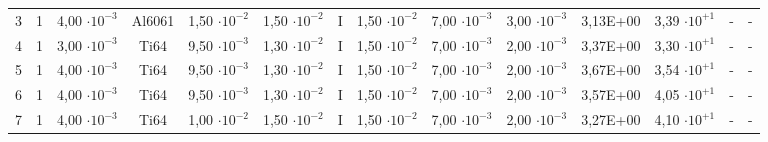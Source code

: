 \begin{table}[H]
{\begin{tabular}{lccccccccccccc}
 3                     & 1                     & 4,00 $\cdot 10^{-3}$              & Al6061                & 1,50 $\cdot 10^{-2}$              & 1,50 $\cdot 10^{-2}$              & I                      & 1,50 $\cdot 10^{-2}$              & 7,00 $\cdot 10^{-3}$              & 3,00 $\cdot 10^{-3}$              & 3,13E+00              & {\cellcolor{red}}3,39 $\cdot 10^{+1}$                    & -                                            & -                                             \\ 
  
 4                     & 1                     & 3,00 $\cdot 10^{-3}$              & Ti64                  & 9,50 $\cdot 10^{-3}$              & 1,30 $\cdot 10^{-2}$              & I                      & 1,50 $\cdot 10^{-2}$              & 7,00 $\cdot 10^{-3}$              & 2,00 $\cdot 10^{-3}$              & 3,37E+00              & {\cellcolor{red}}3,30 $\cdot 10^{+1}$                    & -                                            & -                                             \\ 
  
 5                     & 1                     & 4,00 $\cdot 10^{-3}$              & Ti64                  & 9,50 $\cdot 10^{-3}$              & 1,30 $\cdot 10^{-2}$              & I                      & 1,50 $\cdot 10^{-2}$              & 7,00 $\cdot 10^{-3}$              & 2,00 $\cdot 10^{-3}$              & 3,67E+00              & {\cellcolor{red}}3,54 $\cdot 10^{+1}$                    & -                                            & -                                             \\ 
  
 6                     & 1                     & 4,00 $\cdot 10^{-3}$              & Ti64                  & 9,50 $\cdot 10^{-3}$              & 1,30 $\cdot 10^{-2}$              & I                      & 1,50 $\cdot 10^{-2}$              & 7,00 $\cdot 10^{-3}$              & 2,00 $\cdot 10^{-3}$              & 3,57E+00              & {\cellcolor{red}}4,05 $\cdot 10^{+1}$                    & -                                            & -                                             \\ 
  
 7                     & 1                     & 4,00 $\cdot 10^{-3}$              & Ti64                  & 1,00 $\cdot 10^{-2}$              & 1,50 $\cdot 10^{-2}$              & I                      & 1,50 $\cdot 10^{-2}$              & 7,00 $\cdot 10^{-3}$              & 2,00 $\cdot 10^{-3}$              & 3,27E+00              & {\cellcolor{red}}4,10 $\cdot 10^{+1}$                    & -                                            & -                                             \\ 
  

\end{tabular}}
\end{table}
